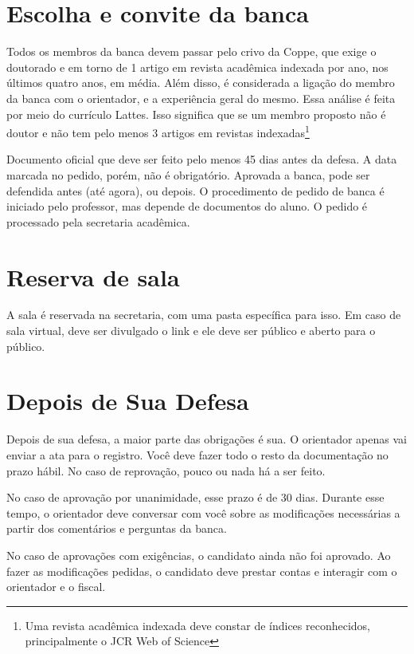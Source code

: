 \section{Escolha e convite da banca}

Todos os membros da banca devem passar pelo crivo da Coppe, que exige o doutorado e em torno de 1 artigo em revista acadêmica indexada por ano, nos últimos quatro anos, em média. Além disso, é considerada a ligação do membro da banca com o orientador, e a experiência geral do mesmo. Essa análise é feita por meio do currículo Lattes. Isso significa que se um membro proposto não é doutor e não tem pelo menos 3 artigos em revistas indexadas\footnote{Uma revista acadêmica indexada deve constar de índices reconhecidos, principalmente o JCR Web of Science}

Documento oficial que deve ser feito pelo menos 45 dias antes da defesa. A data marcada no pedido, porém, não é obrigatório. Aprovada a banca, pode ser defendida antes (até agora), ou depois. O procedimento de pedido de banca é iniciado pelo professor, mas depende de documentos do aluno. O pedido é processado pela secretaria acadêmica.


\section{Reserva de sala}

A sala é reservada na secretaria, com uma pasta específica para isso. Em caso de sala virtual, deve ser divulgado o link e ele deve ser público e aberto para o público. 

\section{Depois de Sua Defesa}

Depois de sua defesa, a maior parte das obrigações é sua. O orientador apenas vai enviar a ata para o registro. Você deve fazer todo o resto da documentação no prazo hábil. No caso de reprovação, pouco ou nada há a ser feito.

No caso de aprovação por unanimidade, esse prazo é de 30 dias. Durante esse tempo, o orientador deve conversar com você sobre as modificações necessárias a partir dos comentários e perguntas da banca.

No caso de aprovações com exigências, o candidato ainda não foi aprovado. Ao fazer as modificações pedidas, o candidato deve prestar contas e interagir com o orientador e o fiscal.

